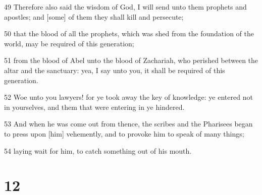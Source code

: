 \par 49 Therefore also said the wisdom of God, I will send unto them prophets and apostles; and [some] of them they shall kill and persecute;
\par 50 that the blood of all the prophets, which was shed from the foundation of the world, may be required of this generation;
\par 51 from the blood of Abel unto the blood of Zachariah, who perished between the altar and the sanctuary: yea, I say unto you, it shall be required of this generation.
\par 52 Woe unto you lawyers! for ye took away the key of knowledge: ye entered not in yourselves, and them that were entering in ye hindered.
\par 53 And when he was come out from thence, the scribes and the Pharisees began to press upon [him] vehemently, and to provoke him to speak of many things;
\par 54 laying wait for him, to catch something out of his mouth.

\chapter{12}

